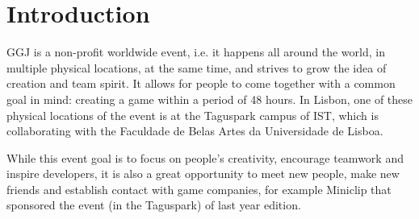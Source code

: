 \documentclass[a4paper,12pt,journal,twoside,compsoc]{PPIEEEtran}
\begin{document}


\maketitle

\IEEEdisplaynontitleabstractindextext
\IEEEpeerreviewmaketitle
\section{Introduction}
% 
% 


 \ac{GGJ} is a non-profit worldwide event, i.e. it happens all around the world, in multiple physical locations, at the same time, and strives to grow the idea of creation and team spirit. It allows for people to come together with a common goal in mind: creating a game within a period of 48 hours. In Lisbon, one of these physical locations of the event is at the Taguspark campus of \ac{IST}, which is collaborating with the Faculdade de Belas Artes da Universidade de Lisboa.

While this event goal is to focus on people's creativity, encourage teamwork and inspire developers, it is also a great opportunity to meet new people, make new friends and establish contact with game companies, for example Miniclip that sponsored the event (in the Taguspark) of last year edition.
\end{document}
